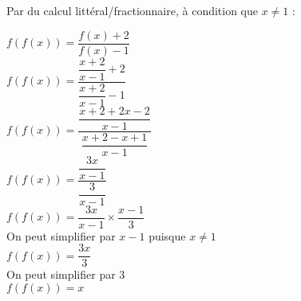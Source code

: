 \begin{corrige}
\begin{enumerate}
        {\red Par du calcul littéral/fractionnaire, à condition que $x\neq 1$ :
        
        $f(f(x)) = \dfrac{f(x)+2}{f(x)-1}$\\\bigskip
        $f(f(x)) = \dfrac{\dfrac{x+2}{x-1}+2}{\dfrac{x+2}{x-1}-1}$\\\bigskip
        $f(f(x)) = \dfrac{\dfrac{x+2+2x-2}{x-1}}{\dfrac{x+2-x+1}{x-1}}$\\\bigskip
        $f(f(x)) = \dfrac{\dfrac{3x}{x-1}}{\dfrac{3}{x-1}}$\\\bigskip
        $f(f(x)) = \dfrac{3x}{x-1}\times \dfrac{x-1}{3}$\\\bigskip
        On peut simplifier par $x-1$ puisque $x\neq1$\\\bigskip
        $f(f(x)) = \dfrac{3x}{3}$\\\bigskip
        On peut simplifier par $3$\\\bigskip
        $f(f(x))=x$
        }
    \end{enumerate}   
\end{corrige}
